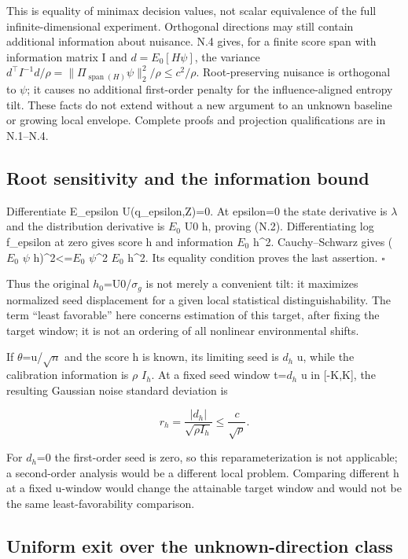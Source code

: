 This is equality of minimax decision values, not scalar equivalence of the full infinite-dimensional experiment. Orthogonal directions may still contain additional information about nuisance. N.4 gives, for a finite score span with information matrix I and \(d=E_0[H\psi]\), the variance \(d^\top I^{-1}d/\rho=\|\Pi_{\operatorname{span}(H)}\psi\|_2^2/\rho\le c^2/\rho\). Root-preserving nuisance is orthogonal to \(\psi\); it causes no additional first-order penalty for the influence-aligned entropy tilt. These facts do not extend without a new argument to an unknown baseline or growing local envelope. Complete proofs and projection qualifications are in N.1--N.4.

\subsection{Root sensitivity and the information bound}\label{root-sensitivity-and-the-information-bound}

Differentiate E\_epsilon U(q\_epsilon,Z)=0. At epsilon=0 the state derivative is \(\lambda\) and the distribution derivative is \(E_0\) U0 h, proving (N.2). Differentiating log f\_epsilon at zero gives score h and information \(E_0\) h\^{}2. Cauchy--Schwarz gives (\(E_0\) \(\psi\) h)\^{}2\textless=\(E_0\) \(\psi\)\^{}2 \(E_0\) h\^{}2. Its equality condition proves the last assertion. \(\square\)

Thus the original \(h_0\)=U0/\(\sigma_g\) is not merely a convenient tilt: it maximizes normalized seed displacement for a given local statistical distinguishability. The term ``least favorable'' here concerns estimation of this target, after fixing the target window; it is not an ordering of all nonlinear environmental shifts.

If \(\theta\)=u/\(\sqrt n\) and the score h is known, its limiting seed is \(d_h\) u, while the calibration information is \(\rho\) \(I_h\). At a fixed seed window t=\(d_h\) u in {[}-K,K{]}, the resulting Gaussian noise standard deviation is

\[
r_h=\frac{|d_h|}{\sqrt{\rho I_h}}\le\frac c{\sqrt\rho}.
\tag{N.4}
\]

For \(d_h\)=0 the first-order seed is zero, so this reparameterization is not applicable; a second-order analysis would be a different local problem. Comparing different h at a fixed u-window would change the attainable target window and would not be the same least-favorability comparison.

\subsection{Uniform exit over the unknown-direction class}\label{uniform-exit-over-the-unknown-direction-class}

